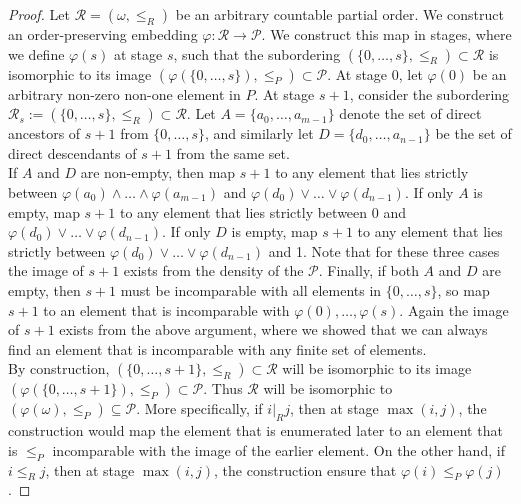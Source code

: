 \documentclass{article}
\begin{document}
\begin{proof}
    Let $\mathcal{R}=(\omega,\leq_R)$ be an arbitrary countable partial
    order. We construct an order-preserving embedding
    $\varphi:\mathcal{R}\rightarrow\mathcal{P}$. We construct this map in
    stages, where we define $\varphi(s)$ at stage $s$, such that the
    subordering $(\{0,\ldots,s\},\leq_R)\subset\mathcal{R}$ is isomorphic
    to its image $(\varphi(\{0,\ldots,s\}),\leq_P)\subset\mathcal{P}$. At
    stage 0, let $\varphi(0)$ be an arbitrary non-zero non-one element in
    $P$. At stage $s+1$, consider the subordering $\mathcal{R}_{s}
    :=(\{0,\ldots,s\},\leq_R)\subset\mathcal{R}$. Let
    $A=\{a_0,\ldots,a_{m-1}\}$ denote the set of direct ancestors of $s+1$
    from $\{0,\ldots,s\}$, and similarly let $D=\{d_0,\ldots,a_{n-1}\}$ be
    the set of direct descendants of $s+1$ from the same set. \\

    If $A$ and $D$ are non-empty, then map $s+1$ to any element that lies
    strictly between $\varphi(a_0)\wedge\ldots\wedge\varphi(a_{m-1})$ and
    $\varphi(d_0)\vee\ldots\vee\varphi(d_{n-1})$. If only $A$ is empty, map
    $s+1$ to any element that lies strictly between 0 and
    $\varphi(d_0)\vee\ldots\vee\varphi(d_{n-1})$. If only $D$ is empty, map
    $s+1$ to any element that lies strictly between
    $\varphi(d_0)\vee\ldots\vee\varphi(d_{n-1})$ and 1. Note that for these
    three cases the image of $s+1$ exists from the density of the
    $\mathcal{P}$. Finally, if both $A$ and $D$ are empty, then $s+1$ must
    be incomparable with all elements in $\{0,\ldots,s\}$, so map $s+1$ to
    an element that is incomparable with $\varphi(0),\ldots,\varphi(s)$.
    Again the image of $s+1$ exists from the above argument, where we
    showed that we can always find an element that is incomparable with any
    finite set of elements. \\

    By construction, $(\{0,\ldots,s+1\},\leq_R)\subset\mathcal{R}$ will be
    isomorphic to its image
    $(\varphi(\{0,\ldots,s+1\}),\leq_P)\subset\mathcal{P}$. Thus
    $\mathcal{R}$ will be isomorphic to
    $(\varphi(\omega),\leq_P)\subseteq\mathcal{P}$. More specifically, if
    $i|_R j$, then at stage $\max(i,j)$, the construction would map the
    element that is enumerated later to an element that is $\leq_P$
    incomparable with the image of the earlier element. On the other hand,
    if $i\leq_R j$, then at stage $\max(i,j)$, the construction ensure that
    $\varphi(i)\leq_P\varphi(j)$.
  \end{proof}
\end{document}
